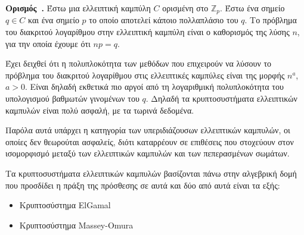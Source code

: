 \documentclass[12pt, a4paper]{book}
\newcounter{definition}[section]
\newenvironment{definition}[1][]{\refstepcounter{definition}\par\medskip
   \textbf{Ορισμός~\thedefinition. #1} \rmfamily}{\medskip}
\begin{document}
\begin{definition}
Έστω μια ελλειπτική καμπύλη $C$ ορισμένη στο $\mathbb{Z}_p$. Έστω ένα σημείο $q \in C$ και ένα σημείο $p$  το οποίο αποτελεί κάποιο πολλαπλάσιο του $q$. Το πρόβλημα του διακριτού λογαρίθμου στην ελλειπτική καμπύλη είναι ο καθορισμός της λύσης $n$, για την οποία έχουμε ότι $np =q$.
\end{definition}

Έχει δειχθεί ότι η πολυπλοκότητα των μεθόδων που επιχειρούν να λύσουν το πρόβλημα του διακριτού λογαρίθμου στις ελλειπτικές καμπύλες είναι της μορφής $n^a$, $a>0$. Είναι δηλαδή εκθετικά πιο αργοί από τη λογαριθμική πολυπλοκότητα του υπολογισμού βαθμωτών γινομένων του $q$. Δηλαδή τα κρυπτοσυστήματα ελλειπτικών καμπυλών είναι πολύ ασφαλή, με τα τωρινά δεδομένα.

Παρόλα αυτά υπάρχει η κατηγορία των υπεριδιάζουσων ελλειπτικών καμπυλών, οι οποίες δεν θεωρούται ασφαλείς, διότι καταρρέουν σε επιθέσεις που στοχεύουν στον ισομορφισμό μεταξύ των ελλειπτικών καμπυλών και των πεπερασμένων σωμάτων.

Τα κρυπτοσυστήματα ελλειπτικών καμπυλών βασίζονται πάνω στην αλγεβρική δομή που προσδίδει η πράξη της πρόσθεσης σε αυτά και δύο από αυτά είναι τα εξής:
\begin{itemize}
\item Κρυπτοσύστημα \textlatin{ElGamal}
\item Κρυπτοσύστημα \textlatin{Massey-Omura}
\end{itemize}
\end{document}

